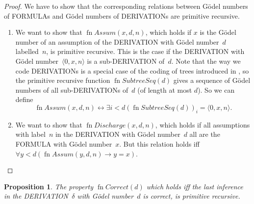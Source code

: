\documentclass[10pt,a4paper]{article}
\makeatletter
\newcommand*{\olup}[1]{\MakeUppercase{#1}}
\theoremstyle{plain}
\newtheorem{prop}[thm]{Proposition}
\theoremstyle{definition}
\theoremstyle{remark}
\newcommand*{\ollabel}[1]{\label{#1}}
\newcommand{\olref}{\@ifnextchar[{\olref@i}{\olref@final}}
\def\olref@i[#1]{\@ifnextchar[{\olref@ii}{\olref@final}}
\def\olref@ii[#1]{\@ifnextchar[{\olref@iii}{\olref@final}}
\def\olref@iii[#1]{\olref@final}
\def\olref@final#1{\ref{#1}}
\providecommand{\lif}{\mathbin{\rightarrow}}
\providecommand{\tuple}[1]{\langle #1 \rangle}
\providecommand{\bforall}{\forall}
\providecommand{\bexists}{\exists}
\providecommand{\defiff}{\mathrel{\leftrightarrow}}
\providecommand{\fn}{\operatorname{fn}}
\makeatother
\begin{document}
\begin{proof}
  We have to show that the corresponding relations between G\"odel
  numbers of \olup{formula}s and G\"odel numbers of \olup{derivation}s are
  primitive recursive.
  \begin{enumerate}
  \item We want to show that $\fn{Assum}(x, d, n)$, which holds if $x$
    is the G\"odel number of an assumption of the \olup{derivation} with
    G\"odel number~$d$ labelled~$n$, is primitive recursive.  This is
    the case if the \olup{derivation} with G\"odel number~$\tuple{0, x,
      n}$ is a sub-\olup{derivation} of~$d$. Note that the way we code
    \olup{derivation}s is a special case of the coding of trees introduced in
    \olref[cmp][rec][tre]{sec}, so the primitive recursive function
    $\fn{SubtreeSeq}(d)$ gives a sequence of G\"odel numbers of all
    sub-\olup{derivation}s of~$d$ (of length at most $d$). So we can
    define
    \[
    \fn{Assum}(x, d, n) \defiff \bexists{i<d}{(\fn{SubtreeSeq}(d))_i =
      \tuple{0, x, n}}.
    \]
  \item We want to show that $\fn{Discharge}(x, d, n)$, which holds if
    all assumptions with label~$n$ in the \olup{derivation} with G\"odel
    number~$d$ all are the \olup{formula} with G\"odel number~$x$.  But
    this relation holds iff $\bforall{y<d}{(\fn{Assum}(y, d, n) \lif y
      = x)}$.
  \end{enumerate}
\end{proof}

\begin{prop}
  \ollabel{prop:followsby}
  The property $\fn{Correct}(d)$ which holds iff the last inference in
  the \olup{derivation}~$\delta$ with G\"odel number~$d$ is correct, is
  primitive recursive.
\end{prop}
\end{document}
